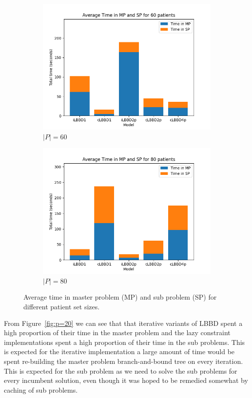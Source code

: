 \begin{figure}
\begin{subfigure}[b]{0.35\textwidth}
        \includegraphics[width=\textwidth]{plots/(60_timeinMPSP).png}
        \caption{$|P|=60$}\label{fig:p=60}
    \end{subfigure}
    \begin{subfigure}[b]{0.35\textwidth}
        \centering
        \includegraphics[width=\textwidth]{plots/(80_timeinMPSP).png}
        \caption{$|P|=80$}\label{fig:p=80}
    \end{subfigure}
    \caption{Average time in master problem (MP) and sub problem (SP) for different patient set sizes.}\label{fig:MPSPtime}
\end{figure}

From Figure~\ref{fig:p=20} we can see that that iterative variants of LBBD spent a high proportion of their time in the master problem and the lazy constraint implementations spent a high proportion of their time in the sub problems. This is expected for the iterative implementation a large amount of time would be spent re-building the master problem branch-and-bound tree on every iteration. This is expected for the sub problem as we need to solve the sub problems for every incumbent solution, even though it was hoped to be remedied somewhat by caching of sub problems.  

